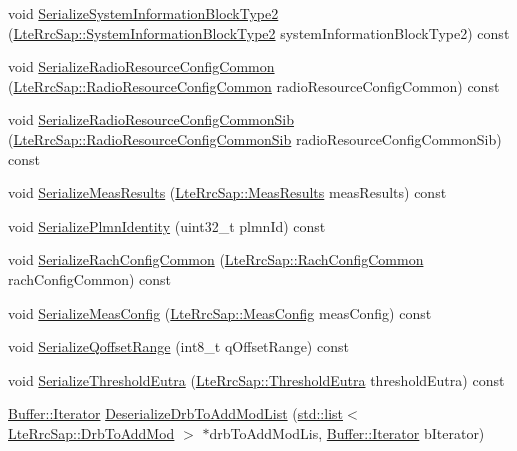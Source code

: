 \begin{DoxyCompactItemize}
\item 
void \hyperlink{classns3_1_1RrcAsn1Header_a47b40bb2492364bff8989e854c835ef1}{Serialize\+System\+Information\+Block\+Type2} (\hyperlink{structns3_1_1LteRrcSap_1_1SystemInformationBlockType2}{Lte\+Rrc\+Sap\+::\+System\+Information\+Block\+Type2} system\+Information\+Block\+Type2) const 
\item 
void \hyperlink{classns3_1_1RrcAsn1Header_a691b63afa53aee8e22b8840ce1d03f61}{Serialize\+Radio\+Resource\+Config\+Common} (\hyperlink{structns3_1_1LteRrcSap_1_1RadioResourceConfigCommon}{Lte\+Rrc\+Sap\+::\+Radio\+Resource\+Config\+Common} radio\+Resource\+Config\+Common) const 
\item 
void \hyperlink{classns3_1_1RrcAsn1Header_a84ce139dfb03bab15f1e88a495cccde0}{Serialize\+Radio\+Resource\+Config\+Common\+Sib} (\hyperlink{structns3_1_1LteRrcSap_1_1RadioResourceConfigCommonSib}{Lte\+Rrc\+Sap\+::\+Radio\+Resource\+Config\+Common\+Sib} radio\+Resource\+Config\+Common\+Sib) const 
\item 
void \hyperlink{classns3_1_1RrcAsn1Header_afd1285a96174a350f1d5c44c57ac8be9}{Serialize\+Meas\+Results} (\hyperlink{structns3_1_1LteRrcSap_1_1MeasResults}{Lte\+Rrc\+Sap\+::\+Meas\+Results} meas\+Results) const 
\item 
void \hyperlink{classns3_1_1RrcAsn1Header_a2824dcd323f61aa425479066d5982e29}{Serialize\+Plmn\+Identity} (uint32\+\_\+t plmn\+Id) const 
\item 
void \hyperlink{classns3_1_1RrcAsn1Header_af915db4fdcfa7d2acb1748d0007afe70}{Serialize\+Rach\+Config\+Common} (\hyperlink{structns3_1_1LteRrcSap_1_1RachConfigCommon}{Lte\+Rrc\+Sap\+::\+Rach\+Config\+Common} rach\+Config\+Common) const 
\item 
void \hyperlink{classns3_1_1RrcAsn1Header_a65f753653303d80ab92df652b8414350}{Serialize\+Meas\+Config} (\hyperlink{structns3_1_1LteRrcSap_1_1MeasConfig}{Lte\+Rrc\+Sap\+::\+Meas\+Config} meas\+Config) const 
\item 
void \hyperlink{classns3_1_1RrcAsn1Header_ad1eb030398d2d91bce3493e8268a3e50}{Serialize\+Qoffset\+Range} (int8\+\_\+t q\+Offset\+Range) const 
\item 
void \hyperlink{classns3_1_1RrcAsn1Header_ab2402f89c75f446c4a06beb1e7a6fed6}{Serialize\+Threshold\+Eutra} (\hyperlink{structns3_1_1LteRrcSap_1_1ThresholdEutra}{Lte\+Rrc\+Sap\+::\+Threshold\+Eutra} threshold\+Eutra) const 
\item 
\hyperlink{classns3_1_1Buffer_1_1Iterator}{Buffer\+::\+Iterator} \hyperlink{classns3_1_1RrcAsn1Header_ad41f6d1c14d8d4f5a8178581d12af3c5}{Deserialize\+Drb\+To\+Add\+Mod\+List} (\hyperlink{openflow-interface_8h_afd9bcfa176617760671b67580f536fa7}{std\+::list}$<$ \hyperlink{structns3_1_1LteRrcSap_1_1DrbToAddMod}{Lte\+Rrc\+Sap\+::\+Drb\+To\+Add\+Mod} $>$ $\ast$drb\+To\+Add\+Mod\+Lis, \hyperlink{classns3_1_1Buffer_1_1Iterator}{Buffer\+::\+Iterator} b\+Iterator)

\end{DoxyCompactItemize}
